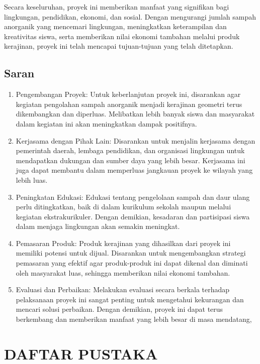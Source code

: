 \documentclass[a4paper,12pt]{article}
\begin{document}
Secara keseluruhan, proyek ini memberikan manfaat yang signifikan bagi lingkungan, pendidikan, ekonomi, dan sosial. Dengan mengurangi jumlah sampah anorganik yang mencemari lingkungan, meningkatkan keterampilan dan kreativitas siswa, serta memberikan nilai ekonomi tambahan melalui produk kerajinan, proyek ini telah mencapai tujuan-tujuan yang telah ditetapkan. 
\subsection{Saran}
\begin{enumerate}
  \item     Pengembangan Proyek: Untuk keberlanjutan proyek ini, disarankan agar kegiatan pengolahan sampah anorganik menjadi kerajinan geometri terus dikembangkan dan diperluas. Melibatkan lebih banyak siswa dan masyarakat dalam kegiatan ini akan meningkatkan dampak positifnya. 
  \item     Kerjasama dengan Pihak Lain: Disarankan untuk menjalin kerjasama dengan pemerintah daerah, lembaga pendidikan, dan organisasi lingkungan untuk mendapatkan dukungan dan sumber daya yang lebih besar. Kerjasama ini juga dapat membantu dalam memperluas jangkauan proyek ke wilayah yang lebih luas. 
  \item     Peningkatan Edukasi: Edukasi tentang pengelolaan sampah dan daur ulang perlu ditingkatkan, baik di dalam kurikulum sekolah maupun melalui kegiatan ekstrakurikuler. Dengan demikian, kesadaran dan partisipasi siswa dalam menjaga lingkungan akan semakin meningkat. 
  \item     Pemasaran Produk: Produk kerajinan yang dihasilkan dari proyek ini memiliki potensi untuk dijual. Disarankan untuk mengembangkan strategi pemasaran yang efektif agar produk-produk ini dapat dikenal dan diminati oleh masyarakat luas, sehingga memberikan nilai ekonomi tambahan. 
  \item     Evaluasi dan Perbaikan: Melakukan evaluasi secara berkala terhadap pelaksanaan proyek ini sangat penting untuk mengetahui kekurangan dan mencari solusi perbaikan. Dengan demikian, proyek ini dapat terus berkembang dan memberikan manfaat yang lebih besar di masa mendatang\cite{GeometriArt},
\pagebreak
\end{enumerate}
    \section*{DAFTAR PUSTAKA}
    \medskip
    \printbibliography
\pagebreak
\end{document}
